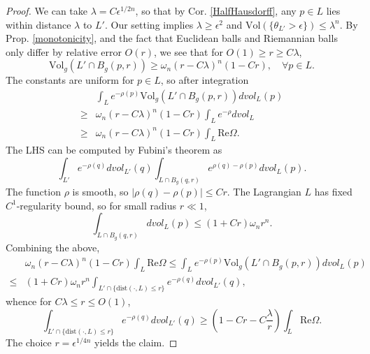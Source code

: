 \documentclass[10pt,a4paper]{amsart}
\begin{document}
\begin{proof}
We can take $\lambda=C\epsilon^{1/2n}$, so that by Cor. \ref{HalfHausdorff}, any $p\in L$ lies within distance $\lambda$ to $L'$. Our setting implies $\lambda\geq \epsilon^2$ and $\text{Vol}(\{\theta_{L'}>\epsilon  \})\leq \lambda^n$. By Prop. \ref{monotonicity}, and the fact that Euclidean balls and Riemannian balls only differ by relative error $O(r)$, we see that for $O(1)\geq r\geq C\lambda$, 
\[
\text{Vol}_g (L'\cap B_g(p,r)) \geq \omega_n (r-C\lambda)^n (1-Cr),\quad \forall p\in L.
\]
The constants are uniform for $p\in L$, so after integration
\[
\begin{split}
& \int_L e^{-\rho(p)}\text{Vol}_g (L'\cap B_g(p,r)) dvol_L(p) 
\\
\geq  & \omega_n (r-C\lambda)^n (1-Cr)\int_L e^{-\rho}dvol_L 
\\
\geq & \omega_n (r-C\lambda)^n (1-Cr)\int_L \text{Re}\Omega.
\end{split}
\]
The LHS can be computed by Fubini's theorem as
\[
\int_{L'} e^{-\rho(q)}dvol_{L'}(q) \int_{L\cap B_g(q,r)} e^{\rho(q)-\rho(p)} dvol_L(p).
\]
The function $\rho$ is smooth, so $|\rho(q)-\rho(p)|\leq Cr$. The Lagrangian $L$ has fixed $C^1$-regularity bound, so for small radius $r\ll 1$,
\[
\int_{L\cap B_g(q,r)} dvol_L(p)\leq (1+Cr) \omega_n r^n.
\]
Combining the above,
\[
\begin{split}
& \omega_n (r-C\lambda)^n (1-Cr)\int_L \text{Re}\Omega\leq \int_L e^{-\rho(p)}\text{Vol}_g (L'\cap B_g(p,r)) dvol_L(p) 
\\
\leq & (1+Cr) \omega_n r^n \int_{L'\cap \{   \text{dist}(\cdot, L)\leq r \} } e^{-\rho(q)}dvol_{L'}(q),
\end{split}
\]
whence for $C\lambda\leq r\leq O(1)$,
\begin{equation}\label{distanceweakL1}
\int_{L'\cap \{   \text{dist}(\cdot, L)\leq r \} } e^{-\rho(q)}dvol_{L'}(q) \geq (1- Cr- C\frac{\lambda}{r}) \int_L \text{Re}\Omega. 
\end{equation}
The choice $r= \epsilon^{1/4n}$ yields the claim.
\end{proof}
\end{document}
